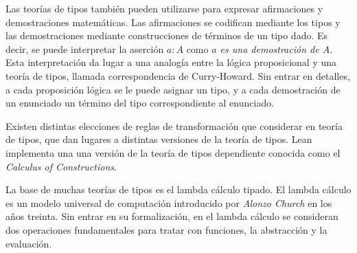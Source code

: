 Las teorías de tipos también pueden utilizarse para expresar afirmaciones y
demostraciones matemáticas. Las afirmaciones se codifican mediante los tipos y
las demostraciones mediante construcciones de términos de un tipo dado. Es
decir, se puede interpretar la aserción $a : A$ como \textit{$a$ es una
	demostración de $A$}. Esta interpretación da lugar a una analogía entre la
lógica proposicional y una teoría de tipos, llamada correspondencia de
Curry-Howard. Sin entrar en detalles, a cada proposición lógica se le puede
asignar un tipo, y a cada demostración de un enunciado un término del tipo
correspondiente al enunciado.

Existen distintas elecciones de reglas de transformación que considerar en
teoría de tipos, que dan lugares a distintas versiones de la teoría de tipos.
Lean implementa una una versión de la teoría de tipos dependiente conocida como
el \textit{Calculus of Constructions}.

La base de muchas teorías de tipos es el lambda cálculo tipado. El lambda
cálculo es un modelo universal de computación introducido por \textit{Alonzo
	Church} en los años treinta. Sin entrar en su formalización, en el lambda
cálculo se consideran dos operaciones fundamentales para tratar con funciones,
la abstracción y la evaluación.

